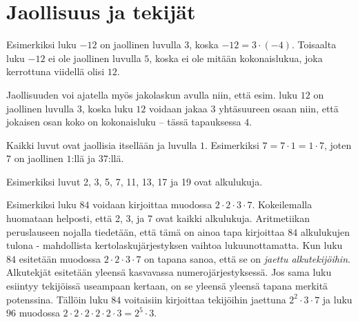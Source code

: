 \section{Jaollisuus ja tekijät}


Esimerkiksi luku $-12$ on jaollinen luvulla $3$, koska $-12=3\cdot (-4)$. Toisaalta luku $-12$ ei ole jaollinen luvulla $5$, koska ei ole mitään kokonaislukua, joka kerrottuna viidellä olisi $12$.

Jaollisuuden voi ajatella myös jakolaskun avulla niin, että esim. luku $12$ on jaollinen luvulla $3$, koska luku $12$ voidaan jakaa $3$ yhtäsuureen osaan niin, että jokaisen osan koko on kokonaisluku -- tässä tapauksessa $4$.


Kaikki luvut ovat jaollisia itsellään ja luvulla $1$. Esimerkiksi $7=7 \cdot 1=1 \cdot 7$, joten $7$ on jaollinen $1$:llä ja $37$:llä.


Esimerkiksi luvut 2, 3, 5, 7, 11, 13, 17 ja 19 ovat alkulukuja. 


Esimerkiksi luku $84$ voidaan kirjoittaa muodossa $2\cdot 2\cdot 3\cdot 7$. Kokeilemalla huomataan helposti, että 2, 3, ja 7 ovat kaikki alkulukuja. Aritmetiikan peruslauseen nojalla tiedetään, että tämä on ainoa tapa kirjoittaa $84$ alkulukujen tulona - mahdollista kertolaskujärjestyksen vaihtoa lukuunottamatta. Kun luku $84$ esitetään muodossa $2\cdot 2\cdot 3\cdot 7$ on tapana sanoa, että se on \emph{jaettu alkutekijöihin}. Alkutekjät esitetään yleensä kasvavassa numerojärjestyksessä. Jos sama luku esiintyy tekijöissä useampaan kertaan, on se yleensä yleensä tapana merkitä potenssina. Tällöin luku $84$ voitaisiin kirjoittaa tekijöihin jaettuna $2^2\cdot 3\cdot 7$ ja luku $96$ muodossa $2\cdot 2\cdot 2\cdot 2\cdot 2\cdot 3=2^5\cdot 3$.

